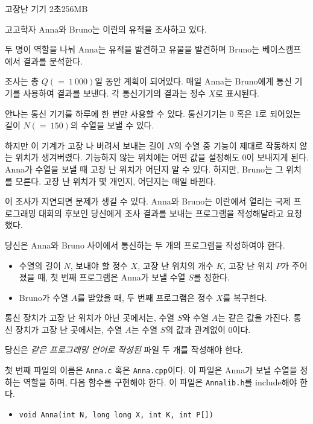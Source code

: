\begin{problem}{고장난 기기}
	{}{}
	{2초}{256MB}{}
	
	고고학자 Anna와 Bruno는 이란의 유적을 조사하고 있다.

	두 명이 역할을 나눠 Anna는 유적을 발견하고 유물을 발견하며 Bruno는 베이스캠프에서 결과를 분석한다.
	
	조사는 총 $Q(=\ 1\ 000)$일 동안 계획이 되어있다. 매일 Anna는 Bruno에게 통신 기기를 사용하여 결과를 보낸다. 각 통신기기의 결과는 정수 $X$로 표시된다.
	
	안나는 통신 기기를 하루에 한 번만 사용할 수 있다. 통신기기는 0 혹은 1로 되어있는 길이 $N(=\ 150)$의 수열을 보낼 수 있다.
	
	하지만 이 기계가 고장 나 버려서 보내는 길이 $N$의 수열 중 기능이 제대로 작동하지 않는 위치가 생겨버렸다. 기능하지 않는 위치에는 어떤 값을 설정해도 0이 보내지게 된다. Anna가 수열을 보낼 때 고장 난 위치가 어딘지 알 수 있다. 하지만, Bruno는 그 위치를 모른다. 고장 난 위치가 몇 개인지, 어딘지는 매일 바뀐다.
	
	이 조사가 지연되면 문제가 생길 수 있다. Anna와 Bruno는 이란에서 열리는 국제 프로그래밍 대회의 후보인 당신에게 조사 결과를 보내는 프로그램을 작성해달라고 요청했다.

	당신은 Anna와 Bruno 사이에서 통신하는 두 개의 프로그램을 작성하여야 한다.
	
	\begin{itemize}
		\item 수열의 길이 $N$, 보내야 할 정수 $X$, 고장 난 위치의 개수 $K$, 고장 난 위치 $P$가 주어졌을 때, 첫 번째 프로그램은 Anna가 보낼 수열 $S$를 정한다.
		\item Bruno가 수열 $A$를 받았을 때, 두 번째 프로그램은 정수 $X$를 복구한다.
	\end{itemize}

	통신 장치가 고장 난 위치가 아닌 곳에서는, 수열 $S$와 수열 $A$는 같은 값을 가진다. 통신 장치가 고장 난 곳에서는, 수열 $A$는 수열 $S$의 값과 관계없이 0이다.


	\Specification
	
	당신은 \textit{같은 프로그래밍 언어로 작성된} 파일 두 개를 작성해야 한다.
	
	첫 번째 파일의 이름은 \texttt{Anna.c} 혹은 \texttt{Anna.cpp}이다. 이 파일은 Anna가 보낼 수열을 정하는 역할을 하며, 다음 함수를 구현해야 한다. 이 파일은 \texttt{Annalib.h}를 include해야 한다.
	
	\begin{itemize}
		\item \texttt{void Anna(int N, long long X, int K, int P[])}
		

\end{itemize}
\end{problem}
